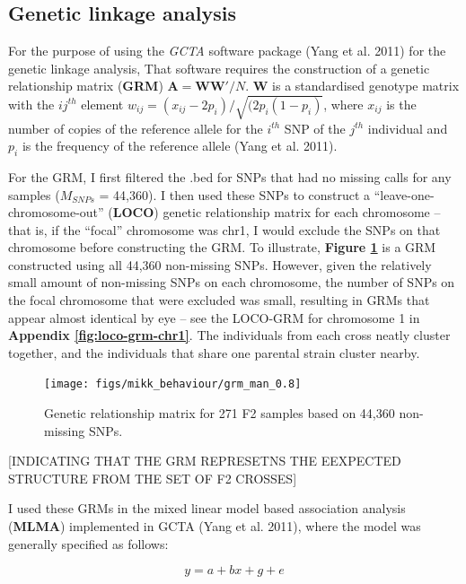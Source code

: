 \documentclass[
]{book}
\begin{document}
\hypertarget{genetic-linkage-analysis}{%
\subsection{Genetic linkage analysis}\label{genetic-linkage-analysis}}

For the purpose of using the \emph{GCTA} software package (Yang et al. 2011) for the genetic linkage analysis, That software requires the construction of a genetic relationship matrix (\textbf{GRM}) \(\textbf{A} = \textbf{WW}'/N\). \(\textbf{W}\) is a standardised genotype matrix with the \(ij^{th}\) element \(w_{ij} = (x_{ij} - 2p_i) / \sqrt{(2p_i(1-p_i)}\), where \(x_{ij}\) is the number of copies of the reference allele for the \(i^{th}\) SNP of the \(j^{th}\) individual and \(p_i\) is the frequency of the reference allele (Yang et al. 2011).

For the GRM, I first filtered the .bed for SNPs that had no missing calls for any samples (\(M_{SNPs}\) = 44,360). I then used these SNPs to construct a ``leave-one-chromosome-out'' (\textbf{LOCO}) genetic relationship matrix for each chromosome -- that is, if the ``focal'' chromosome was chr1, I would exclude the SNPs on that chromosome before constructing the GRM. To illustrate, \textbf{Figure \ref{fig:F2-grm}} is a GRM constructed using all 44,360 non-missing SNPs. However, given the relatively small amount of non-missing SNPs on each chromosome, the number of SNPs on the focal chromosome that were excluded was small, resulting in GRMs that appear almost identical by eye -- see the LOCO-GRM for chromosome 1 in \textbf{Appendix \ref{fig:loco-grm-chr1}}. The individuals from each cross neatly cluster together, and the individuals that share one parental strain cluster nearby.



\begin{figure}
\texttt{[image: figs/mikk\_behaviour/grm\_man\_0.8]} \caption{Genetic relationship matrix for 271 F2 samples based on 44,360 non-missing SNPs.}\label{fig:F2-grm}
\end{figure}

{[}INDICATING THAT THE GRM REPRESETNS THE EEXPECTED STRUCTURE FROM THE SET OF F2 CROSSES{]}

I used these GRMs in the mixed linear model based association analysis (\textbf{MLMA}) implemented in GCTA (Yang et al. 2011), where the model was generally specified as follows:

\[
y = a + bx + g + e
\]
\end{document}
